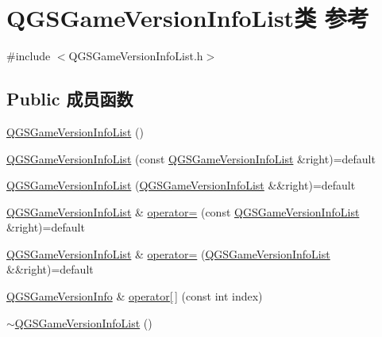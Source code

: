 \hypertarget{class_q_g_s_game_version_info_list}{}\section{Q\+G\+S\+Game\+Version\+Info\+List类 参考}
\label{class_q_g_s_game_version_info_list}


{\ttfamily \#include $<$Q\+G\+S\+Game\+Version\+Info\+List.\+h$>$}

\subsection*{Public 成员函数}
\begin{DoxyCompactItemize}
\item 
\mbox{\hyperlink{class_q_g_s_game_version_info_list_a725dd9a06d2220acce7d36f8aa2d6de2}{Q\+G\+S\+Game\+Version\+Info\+List}} ()
\item 
\mbox{\hyperlink{class_q_g_s_game_version_info_list_a1a203cdf185c4f28f308fbee5a1adf5f}{Q\+G\+S\+Game\+Version\+Info\+List}} (const \mbox{\hyperlink{class_q_g_s_game_version_info_list}{Q\+G\+S\+Game\+Version\+Info\+List}} \&right)=default
\item 
\mbox{\hyperlink{class_q_g_s_game_version_info_list_af6677a5972af572996e3a5ab12ffb183}{Q\+G\+S\+Game\+Version\+Info\+List}} (\mbox{\hyperlink{class_q_g_s_game_version_info_list}{Q\+G\+S\+Game\+Version\+Info\+List}} \&\&right)=default
\item 
\mbox{\hyperlink{class_q_g_s_game_version_info_list}{Q\+G\+S\+Game\+Version\+Info\+List}} \& \mbox{\hyperlink{class_q_g_s_game_version_info_list_a42160ed04b523d4b87d8875e25219358}{operator=}} (const \mbox{\hyperlink{class_q_g_s_game_version_info_list}{Q\+G\+S\+Game\+Version\+Info\+List}} \&right)=default
\item 
\mbox{\hyperlink{class_q_g_s_game_version_info_list}{Q\+G\+S\+Game\+Version\+Info\+List}} \& \mbox{\hyperlink{class_q_g_s_game_version_info_list_ad227a188528f1c32d6209a6793471388}{operator=}} (\mbox{\hyperlink{class_q_g_s_game_version_info_list}{Q\+G\+S\+Game\+Version\+Info\+List}} \&\&right)=default
\item 
\mbox{\hyperlink{class_q_g_s_game_version_info}{Q\+G\+S\+Game\+Version\+Info}} \& \mbox{\hyperlink{class_q_g_s_game_version_info_list_a32aca0acb6a473d8a922df578dd04cbe}{operator\mbox{[}$\,$\mbox{]}}} (const int index)
\item 
\mbox{\hyperlink{class_q_g_s_game_version_info_list_a8fb9167d52b8a9189db6bdd8e81e9071}{$\sim$\+Q\+G\+S\+Game\+Version\+Info\+List}} ()

\end{DoxyCompactItemize}
